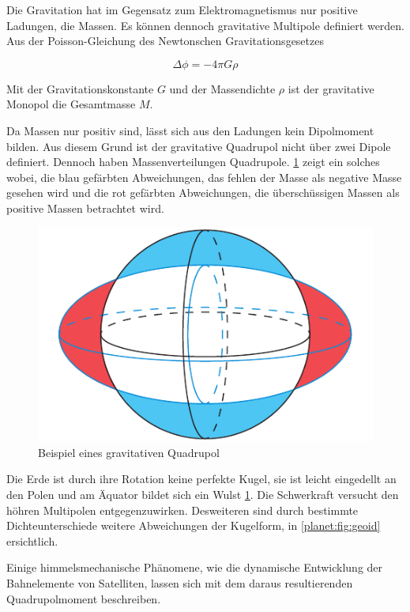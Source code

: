 Die Gravitation hat im Gegensatz zum Elektromagnetismus nur positive Ladungen, die Massen.
Es können dennoch gravitative Multipole definiert werden.
Aus der Poisson-Gleichung des Newtonschen Gravitationsgesetzes

\begin{equation*}
    \Delta \phi = -4\pi G\rho
\end{equation*}

\noindent
Mit der Gravitationskonstante \(G\) und der Massendichte \(\rho\) ist der gravitative Monopol die Gesamtmasse \(M\).

Da Massen nur positiv sind, lässt sich aus den Ladungen kein Dipolmoment bilden.
Aus diesem Grund ist der gravitative Quadrupol nicht über zwei Dipole definiert.
Dennoch haben Massenverteilungen Quadrupole.
\cref{planet:fig:quadroearth} zeigt ein solches wobei, die blau gefärbten Abweichungen, das fehlen der Masse als negative Masse gesehen wird und die rot gefärbten Abweichungen, die überschüssigen Massen als positive Massen betrachtet wird.  

\begin{figure}[h]
    \centering
    \includegraphics[width=0.60\linewidth]{papers/planet/pictures/Quadroearth.pdf}
    \caption{Beispiel eines gravitativen Quadrupol
        \label{planet:fig:quadroearth}}
\end{figure}

\begin{beispiel}
    Die Erde ist durch ihre Rotation keine perfekte Kugel, sie ist leicht eingedellt an den Polen und am Äquator bildet sich ein Wulst \cref{planet:fig:quadroearth}.
    Die Schwerkraft versucht den höhren Multipolen entgegenzuwirken.
    Desweiteren sind durch bestimmte Dichteunterschiede weitere Abweichungen der Kugelform, in \cref{planet:fig:geoid} ersichtlich.
\end{beispiel}

Einige himmelsmechanische Phänomene, wie die dynamische Entwicklung der Bahnelemente von Satelliten, lassen sich mit dem daraus resultierenden Quadrupolmoment beschreiben.
